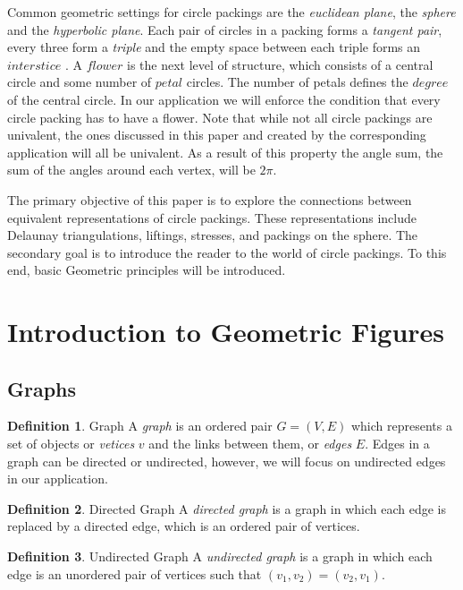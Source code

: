 \documentclass[11pt]{article}
\theoremstyle{definition}
\newtheorem{definition}{Definition}[section]
\begin{document}
Common geometric settings for circle packings are the \emph{euclidean plane}, the \emph{sphere} and the \emph{hyperbolic plane}. Each pair of circles in a packing forms a \emph{tangent pair}, every three form a \emph{triple} and the empty space between each triple forms an $interstice$ \cite{stephenson05introduction}. A $flower$ is the next level of structure, which consists of a central circle and some number of $petal$ circles. The number of petals defines the $degree$ of the central circle. In our application we will enforce the condition that every circle packing has to have a flower. Note that while not all circle packings are univalent, the ones discussed in this paper and created by the corresponding application will all be univalent. As a result of this property the angle sum, the sum of the angles around each vertex, will be $2\pi$.

The primary objective of this paper is to explore the connections between equivalent representations of circle packings. These representations include Delaunay triangulations, liftings, stresses, and packings on the sphere. The secondary goal is to introduce the reader to the world of circle packings. To this end, basic Geometric principles will be introduced.

\section{Introduction to Geometric Figures}
\subsection{Graphs}
	\theoremstyle{definition}
	\begin{definition}{Graph}
		A \emph{graph} is an ordered pair $G=(V,E)$ which represents a set of objects or \emph{vetices} $v$ and the links between them, or \emph{edges} $E$. 
		Edges in a graph can be directed or undirected, however, we will focus on undirected edges in our application. 
	\end{definition}
	
	\theoremstyle{definition}
	\begin{definition}{Directed Graph}
  		A \emph{directed graph} is a graph in which each edge is replaced by a directed edge, which is an ordered pair of vertices.
  	\end{definition}
	
	\theoremstyle{definition}
	\begin{definition}{Undirected Graph}
  		A \emph{undirected graph} is a graph in which each edge is an unordered pair of vertices such that $(v_1, v_2) = (v_2, v_1)$.
  	\end{definition}
	
\end{document}
